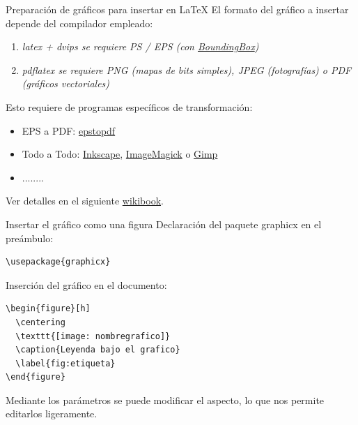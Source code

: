 \documentclass[10pt]{beamer}
\begin{document}
\begin{frame}{Preparaci\'on de gr\'aficos para insertar en \LaTeX}
El formato del gr\'afico a insertar depende del compilador empleado:
\begin{enumerate}
\item \it{latex + dvips}  se requiere PS / EPS {\scriptsize(con \href{http://tex.stackexchange.com/questions/133786/no-boundingbox-error-message}{\color{blue}BoundingBox})}
\item \it {pdflatex} se requiere PNG {\scriptsize(mapas de bits simples)}, JPEG {\scriptsize(fotograf\'ias)} o PDF {\scriptsize(gr\'aficos vectoriales)}
\end{enumerate}

\vspace{0.5cm}
Esto requiere de programas espec\'ificos de transformaci\'on:
\begin{itemize}
\item {\sc EPS a PDF}: \href{http://tug.org/epstopdf/}{\color{blue}epstopdf}
\item {\sc Todo a Todo}: \href{http://www.inkscape.org/es/}{\color{blue}Inkscape}, 
\href{http://www.imagemagick.org}{\color{blue}ImageMagick} o \href{http://www.gimp.org/}{\color{blue}Gimp}
\item ........
\end{itemize}
Ver detalles en el siguiente  \href{https://w.wiki/9Luv}{\color{blue}wikibook}.
\end{frame}

\begin{frame}[fragile]{Insertar el gr\'afico como una figura}
Declaraci\'on del paquete graphicx en el pre\'ambulo:
\begin{verbatim}\usepackage{graphicx} \end{verbatim}

Inserci\'on del gr\'afico en el documento:
\begin{verbatim}
\begin{figure}[h]
  \centering
  \texttt{[image: nombregrafico]}
  \caption{Leyenda bajo el grafico}
  \label{fig:etiqueta}
\end{figure}
\end{verbatim}
Mediante los par\'ametros se puede modificar el aspecto, lo que 
nos permite editarlos ligeramente.
\end{frame}
\end{document}
